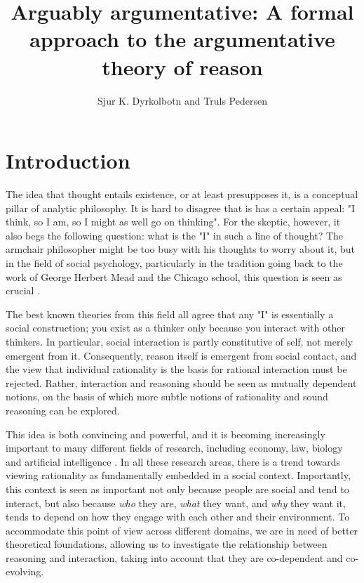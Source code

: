 \documentclass[greybox]{svmult}
\begin{document}
\title*{Arguably argumentative: A formal approach to the argumentative theory of reason}
\author{Sjur K. Dyrkolbotn and Truls Pedersen}
\maketitle

\section{Introduction}\label{sec:intro}

The idea that thought entails existence, or at least presupposes it, is a conceptual pillar of analytic philosophy. It is hard to disagree that is has a certain appeal: "I think, so I am, so I might as well go on thinking". For the skeptic, however, it also begs the following question: what is the "I" in such a line of thought? The armchair philosopher might be too busy with his thoughts to worry about it, but in the field of social psychology, particularly in the tradition going back to the work of George Herbert Mead and the Chicago school, this question is seen as crucial \cite{mead}.

The best known theories from this field all agree that any "I" is essentially a social construction; you exist as a thinker only because you interact with other thinkers. In particular, social interaction is partly constitutive of self, not merely emergent from it. Consequently, reason itself is emergent from social contact, and the view that individual rationality is the basis for rational interaction must be rejected. Rather, interaction and reasoning should be seen as mutually dependent notions, on the basis of which more subtle notions of rationality and sound reasoning can be explored.

This idea is both convincing and powerful, and it is becoming increasingly important to many different fields of research, including economy, law, biology and artificial intelligence \cite{blume,dworkin,waal,benthem,ossowski}. In all these research areas, there is a trend towards  viewing rationality as fundamentally embedded in a social context. Importantly, this context is seen as important not only because people are social and tend to interact, but also because \emph{who} they are, \emph{what} they want, and \emph{why} they want it, tends to depend on how they engage with each other and their environment. %
To accommodate this point of view across different domains, we are in need of better theoretical foundations, allowing us to investigate the relationship between reasoning and interaction, taking into account that they are co-dependent and co-evolving.
\end{document}
